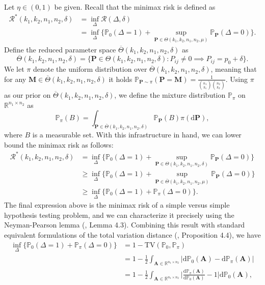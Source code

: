 \documentclass{article}
\newcommand{\D}{\textrm{d}}
\newcommand{\R}{\mathbb{R}}
\newcommand{\A}{\mathbf{A}}
\newcommand{\bbP}{\mathbb{P}}
\newcommand{\bP}{\mathbf{P}}
\newcommand{\cR}{\mathcal{R}}
\begin{document}
\bigskip \noindent Let $\eta \in (0,1)$ be given. Recall that the minimax risk is defined as
\begin{align*}
    \cR^*(k_1,k_2,n_1,n_2, \delta) &= \inf_\Delta \cR(\Delta, \delta) \\ 
    &= \inf_\Delta\Big\{\mathbb P_{0}(\Delta = 1) + \sup_{\bP \in \Theta(k_1,k_2,n_1,n_2, \mu)} \mathbb P_\bP(\Delta = 0)\Big\}.
\end{align*}
Define the reduced parameter space $\overline{\Theta}(k_1, k_2, n_1, n_2, \delta)$ as
\[\overline{\Theta}(k_1, k_2, n_1, n_2, \delta) = \{\bP \in \Theta(k_1, k_2, n_1, n_2, \delta) : P_{ij} \neq 0 \implies P_{ij} = p_0 + \delta\}.\]
We let $\pi$ denote the uniform distribution over $\overline{\Theta}(k_1, k_2, n_1, n_2, \delta)$, meaning that for any $\mathbf M \in \overline{\Theta}(k_1, k_2, n_1, n_2, \delta)$ it holds $\bbP_{\bP \sim \pi}(\bP = \mathbf M) = \frac{1}{{n_1 \choose k_1}{n_2 \choose k_2}}$. Using $\pi$ as our prior on $\overline{\Theta}(k_1, k_2, n_1, n_2, \delta)$, we define the mixture distribution $\mathbb{P}_\pi$ on $\R^{n_1\times n_2}$ as
\[\mathbb P_{\pi}(B)=\int_{\bP \in \overline{\Theta}(k_1, k_2, n_1, n_2, \delta)}\bbP_\bP(B)\pi(\D \bP),\]
where $B$ is a measurable set. With this infrastructure in hand, we can lower bound the minimax risk as follows:
\begin{align*}
    \cR^*(k_1,k_2,n_1,n_2, \delta) &=\inf_\Delta\Big\{\mathbb P_{0}(\Delta = 1) + \sup_{\bP \in \Theta(k_1,k_2,n_1,n_2, \delta)} \mathbb P_\bP(\Delta = 0)\Big\} \\
    &\geq \inf_\Delta\Big\{\mathbb P_{0}(\Delta = 1) + \sup_{\bP \in \overline{\Theta}(k_1,k_2,n_1,n_2, \mu)} \mathbb P_\bP(\Delta = 0)\Big\} \\
    &\geq \inf_\Delta\Big\{\mathbb P_{0}(\Delta = 1) + \mathbb P_\pi(\Delta = 0)\Big\}.
\end{align*}
The final expression above is the minimax risk of a simple versus simple hypothesis testing problem, and we can characterize it precisely using the Neyman-Pearson lemma (\cite{rigollet2023high}, Lemma 4.3). Combining this result with standard equivalent formulations of the total variation distance (\cite{rigollet2023high}, Proposition 4.4), we have
\begin{align*}
    \inf_\Delta\Big\{\mathbb P_{0}(\Delta = 1) + \mathbb P_\pi(\Delta = 0)\Big\} &= 1 - \text{TV}(\bbP_0, \mathbb P_{\pi}) \\
    &= 1 - \frac12\int_{\A \in \R^{n_1\times n_2}}|\D\bbP_0(\A) - \D \mathbb P_\pi (\A)| \\
    &= 1 - \frac12\int_{\A \in \R^{n_1\times n_2}}\Big|\frac{\D\mathbb P_\pi (\A)}{\D \bbP_0(\A)} - 1\Big|\D \bbP_0(\A),
\end{align*}
\end{document}
